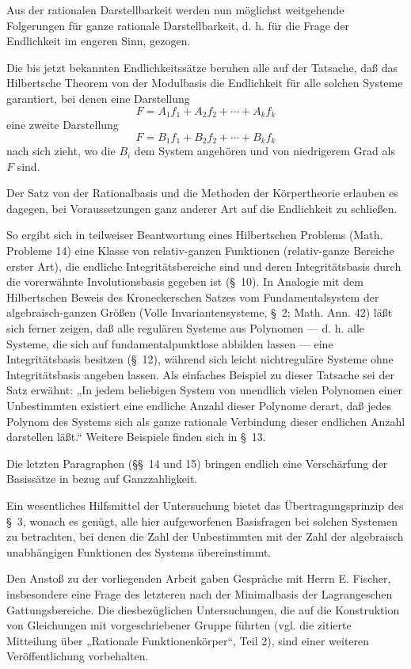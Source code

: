 \documentclass[11pt]{article}
\begin{document}
Aus der rationalen Darstellbarkeit werden nun möglichst weitgehende Folgerungen für ganze rationale Darstellbarkeit, d. h. für die Frage der Endlichkeit im engeren Sinn, gezogen.

Die bis jetzt bekannten Endlichkeitssätze beruhen alle auf der Tatsache, daß das Hilbertsche Theorem von der Modulbasis die Endlichkeit für alle solchen Systeme garantiert, bei denen eine Darstellung
\[
  F=A_1f_1+A_2f_2+\cdots+A_kf_k
\]
eine zweite Darstellung
\[
  F=B_1f_1+B_2f_2+\cdots+B_kf_k
\]
nach sich zieht, wo die $B_i$ dem System angehören und von niedrigerem Grad als $F$ sind.

Der Satz von der Rationalbasis und die Methoden der Körpertheorie erlauben es dagegen, bei Voraussetzungen ganz anderer Art auf die Endlichkeit zu schließen.

So ergibt sich in teilweiser Beantwortung eines Hilbertschen Problems (Math. Probleme 14) eine Klasse von relativ-ganzen Funktionen (relativ-ganze Bereiche erster Art), die endliche Integritätsbereiche sind und deren Integritätsbasis durch die vorerwähnte Involutionsbasis gegeben ist (\S\ 10). In Analogie mit dem Hilbertschen Beweis des Kroneckerschen Satzes vom Fundamentalsystem der algebraisch-ganzen Größen (Volle Invariantensysteme, \S\ 2; Math. Ann. 42) läßt sich ferner zeigen, daß alle regulären Systeme aus Polynomen --- d. h. alle Systeme, die sich auf fundamentalpunktlose abbilden lassen --- eine Integritätsbasis besitzen (\S\ 12), während sich leicht nichtreguläre Systeme ohne Integritätsbasis angeben lassen. Als einfaches Beispiel zu dieser Tatsache sei der Satz erwähnt: „In jedem beliebigen System von unendlich vielen Polynomen einer Unbestimmten existiert eine endliche Anzahl dieser Polynome derart, daß jedes Polynom des Systems sich als ganze rationale Verbindung dieser endlichen Anzahl darstellen läßt.“ Weitere Beispiele finden sich in \S\ 13.

Die letzten Paragraphen (\S\S\ 14 und 15) bringen endlich eine Verschärfung der Basissätze in bezug auf Ganzzahligkeit.

Ein wesentliches Hilfsmittel der Untersuchung bietet das Übertragungsprinzip des \S\ 3, wonach es genügt, alle hier aufgeworfenen Basisfragen bei solchen Systemen zu betrachten, bei denen die Zahl der Unbestimmten mit der Zahl der algebraisch unabhängigen Funktionen des Systems übereinstimmt.

Den Anstoß zu der vorliegenden Arbeit gaben Gespräche mit Herrn E. Fischer, insbesondere eine Frage des letzteren nach der Minimalbasis der Lagrangeschen Gattungsbereiche. Die diesbezüglichen Untersuchungen, die auf die Konstruktion von Gleichungen mit vorgeschriebener Gruppe führten (vgl. die zitierte Mitteilung über „Rationale Funktionenkörper“, Teil 2), sind einer weiteren Veröffentlichung vorbehalten.
\end{document}
